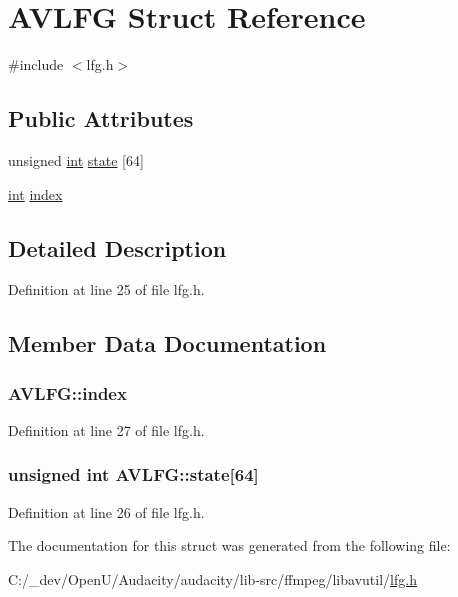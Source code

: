 \hypertarget{struct_a_v_l_f_g}{}\section{A\+V\+L\+FG Struct Reference}
\label{struct_a_v_l_f_g}


{\ttfamily \#include $<$lfg.\+h$>$}

\subsection*{Public Attributes}
\begin{DoxyCompactItemize}
\item 
unsigned \hyperlink{xmltok_8h_a5a0d4a5641ce434f1d23533f2b2e6653}{int} \hyperlink{struct_a_v_l_f_g_a9ddcde4642e40a41a3a945b24b4ce519}{state} \mbox{[}64\mbox{]}
\item 
\hyperlink{xmltok_8h_a5a0d4a5641ce434f1d23533f2b2e6653}{int} \hyperlink{struct_a_v_l_f_g_ae05dc3450a4c7e13f79d02812218a8f4}{index}
\end{DoxyCompactItemize}


\subsection{Detailed Description}


Definition at line 25 of file lfg.\+h.



\subsection{Member Data Documentation}
\subsubsection[{\texorpdfstring{index}{index}}]{ A\+V\+L\+F\+G\+::index}\hypertarget{struct_a_v_l_f_g_ae05dc3450a4c7e13f79d02812218a8f4}{}\label{struct_a_v_l_f_g_ae05dc3450a4c7e13f79d02812218a8f4}


Definition at line 27 of file lfg.\+h.

\subsubsection[{\texorpdfstring{state}{state}}]{\setlength{\rightskip}{0pt plus 5cm}unsigned {\bf int} A\+V\+L\+F\+G\+::state\mbox{[}64\mbox{]}}\hypertarget{struct_a_v_l_f_g_a9ddcde4642e40a41a3a945b24b4ce519}{}\label{struct_a_v_l_f_g_a9ddcde4642e40a41a3a945b24b4ce519}


Definition at line 26 of file lfg.\+h.



The documentation for this struct was generated from the following file\+:\begin{DoxyCompactItemize}
\item 
C\+:/\+\_\+dev/\+Open\+U/\+Audacity/audacity/lib-\/src/ffmpeg/libavutil/\hyperlink{lfg_8h}{lfg.\+h}\end{DoxyCompactItemize}
